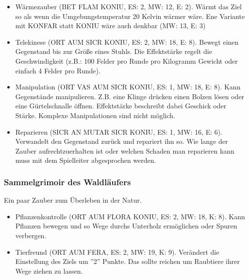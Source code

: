 \documentclass{article}
\begin{document}
\begin{itemize}
\item Wärmezauber (BET FLAM KONIU, ES: 2, MW: 12, E: 2). Wärmt das Ziel so als wenn die Umgebungstemperatur 20 Kelvin wärmer wäre. Ene Variante mit KONFAR statt KONIU wäre auch denkbar (MW: 13, E: 3)
\end{itemize}

\begin{itemize}
\item Telekinese (ORT AUM SICR KONIU, ES: 2, MW: 18, E: 8). Bewegt einen Gegenstand bis zur Größe eines Stuhls. Die Effektstärke regelt die Geschwindigkeit (z.B.: 100 Felder pro Runde pro Kilogramm Gewicht oder einfach 4 Felder pro Runde).
\end{itemize}

\begin{itemize}
\item Manipulation (ORT VAS AUM SICR KONIU, ES: 1, MW: 18, E: 8). Kann Gegenstände manipulieren. Z.B. eine Klinge drücken einen Bolzen lösen oder eine Gürtelschnalle öffnen. Effektstärke beschreibt dabei Geschick oder Stärke. Komplexe Manipulationen sind nicht möglich.
\end{itemize}

\begin{itemize}
\item Reparieren (SICR AN MUTAR SICR KONIU, ES: 1, MW: 16, E: 6). Verwandelt den Gegenstand zurück und repariert ihn so. Wie lange der Zauber aufrechtzuerhalten ist oder welchen Schaden man reparieren kann muss mit dem Spielleiter abgesprochen werden.
\end{itemize}

\subsubsection{Sammelgrimoir des Waldläufers}

Ein paar Zauber zum Überleben in der Natur.

\begin{itemize}
\item Pflanzenkontrolle (ORT AUM FLORA KONIU, ES: 2, MW: 18, K: 8). Kann Pflanzen bewegen und so Wege durchs Unterholz ermöglichen oder Spuren verbergen.
\end{itemize}

\begin{itemize}
\item Tierfreund (ORT AUM FERA, ES: 2, MW: 19, K: 9). Verändert die Einstellung des Ziels um ''2'' Punkte. Das sollte reichen um Raubtiere ihrer Wege ziehen zu lassen.
\end{itemize}
\end{document}

